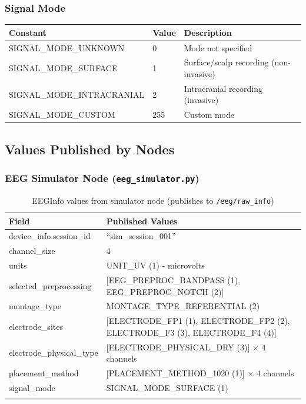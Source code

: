 \documentclass[11pt,a4paper]{article}
\begin{document}
\subsubsection{Signal Mode}
\begin{longtable}{|>{\small}l|>{\small}l|>{\small}p{7cm}|}
\hline
\textbf{Constant} & \textbf{Value} & \textbf{Description} \\
\hline
SIGNAL\_MODE\_UNKNOWN & 0 & Mode not specified \\
SIGNAL\_MODE\_SURFACE & 1 & Surface/scalp recording (non-invasive) \\
SIGNAL\_MODE\_INTRACRANIAL & 2 & Intracranial recording (invasive) \\
SIGNAL\_MODE\_CUSTOM & 255 & Custom mode \\
\hline
\end{longtable}

\subsection{Values Published by Nodes}

\subsubsection{EEG Simulator Node (\texttt{eeg\_simulator.py})}
\begin{longtable}{|>{\small}p{4cm}|>{\small}p{9cm}|}
\hline
\textbf{Field} & \textbf{Published Values} \\
\hline
device\_info.session\_id & ``sim\_session\_001'' \\
channel\_size & 4 \\
units & UNIT\_UV (1) - microvolts \\
selected\_preprocessing & [EEG\_PREPROC\_BANDPASS (1), EEG\_PREPROC\_NOTCH (2)] \\
montage\_type & MONTAGE\_TYPE\_REFERENTIAL (2) \\
electrode\_sites & [ELECTRODE\_FP1 (1), ELECTRODE\_FP2 (2), ELECTRODE\_F3 (3), ELECTRODE\_F4 (4)] \\
electrode\_physical\_type & [ELECTRODE\_PHYSICAL\_DRY (3)] × 4 channels \\
placement\_method & [PLACEMENT\_METHOD\_1020 (1)] × 4 channels \\
signal\_mode & SIGNAL\_MODE\_SURFACE (1) \\
\hline
\caption{EEGInfo values from simulator node (publishes to \texttt{/eeg/raw\_info})}
\end{longtable}
\end{document}
